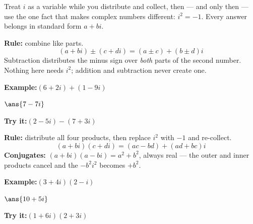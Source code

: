 \documentclass[12pt]{article}
\begin{document}

\noindent\small Treat $i$ as a variable while you distribute and collect, then
--- and only then --- use the one fact that makes complex numbers different:
$i^2 = -1$. Every answer belongs in standard form $a + bi$.
\normalsize

\begin{formulabox}
\textbf{Rule:} combine like parts.
\[ (a+bi) \pm (c+di) = (a \pm c) + (b \pm d)i \]
Subtraction distributes the minus sign over \emph{both} parts of the second
number. Nothing here needs $i^2$; addition and subtraction never create one.
\end{formulabox}
\begin{examplebox}
\textbf{Example:}\quad $(6 + 2i) + (1 - 9i)$
\par
$\ans{7-7i}$
\end{examplebox}
\begin{tryitbox}
\textbf{Try it:}\quad $(2 - 5i) - (7 + 3i)$\\[2pt]
\end{tryitbox}

\begin{formulabox}
\textbf{Rule:} distribute all four products, then replace $i^2$ with $-1$ and
re-collect.
\[ (a+bi)(c+di) = (ac - bd) + (ad + bc)i \]
\textbf{Conjugates:} $(a+bi)(a-bi) = a^2 + b^2$, always real --- the outer and
inner products cancel and the $-b^2i^2$ becomes $+b^2$.
\end{formulabox}
\begin{examplebox}
\textbf{Example:}\quad $(3 + 4i)(2 - i)$
\par
$\ans{10+5i}$
\end{examplebox}
\begin{tryitbox}
\textbf{Try it:}\quad $(1 + 6i)(2 + 3i)$\\[2pt]
\end{tryitbox}
\end{document}
